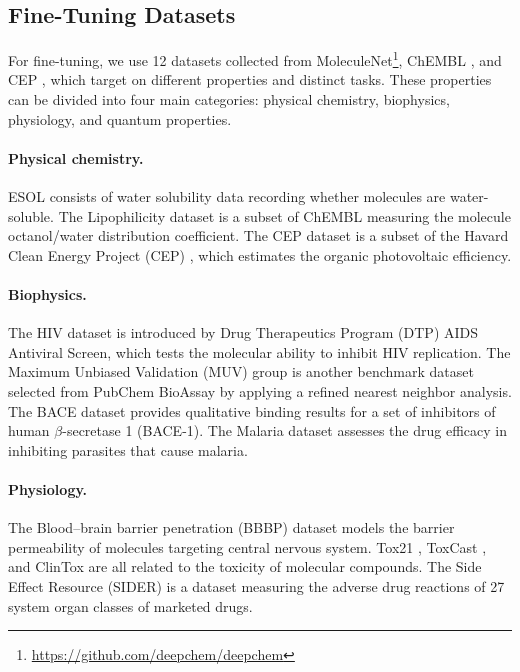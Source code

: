 \subsection{Fine-Tuning Datasets}
For fine-tuning, we use 12 datasets collected from MoleculeNet\footnote{\url{https://github.com/deepchem/deepchem}}\cite{Wu:2018dv}, ChEMBL \cite{Gaulton:2011ch}, and CEP \cite{Hachmann:2011ce}, which target on different properties and distinct tasks. These properties can be divided into four main categories: physical chemistry, biophysics, physiology, and quantum properties.

\paragraph{Physical chemistry.}
ESOL \cite{Delaney:2004es} consists of water solubility data recording whether molecules are water-soluble.
The Lipophilicity dataset is a subset of ChEMBL \cite{Gaulton:2011ch} measuring the molecule octanol/water distribution coefficient.
The CEP dataset is a subset of the Havard Clean Energy Project (CEP) \cite{Hachmann:2011ce}, which estimates the organic photovoltaic efficiency.

\paragraph{Biophysics.}
The HIV dataset \cite{AIDS:as} is introduced by Drug Therapeutics Program (DTP) AIDS Antiviral Screen, which tests the molecular ability to inhibit HIV replication.
The Maximum Unbiased Validation (MUV) group \cite{Rohrer:2009mu} is another benchmark dataset selected from PubChem BioAssay by applying a refined nearest neighbor analysis.
The BACE dataset provides qualitative binding results for a set of inhibitors of human \(\beta\)-secretase 1 (BACE-1).
The Malaria dataset \cite{Gamo:2010wo} assesses the drug efficacy in inhibiting parasites that cause malaria.

\paragraph{Physiology.}
The Blood–brain barrier penetration (BBBP) dataset \cite{Martins:2012ba} models the barrier permeability of molecules targeting central nervous system.
Tox21 \cite{Tox21:2014cl}, ToxCast \cite{Richard:2016tc}, and ClinTox \cite{Gayvert:2016ad} are all related to the toxicity of molecular compounds.
The Side Effect Resource (SIDER) \cite{Kuhn:2016sd} is a dataset measuring the adverse drug reactions of 27 system organ classes of marketed drugs.

